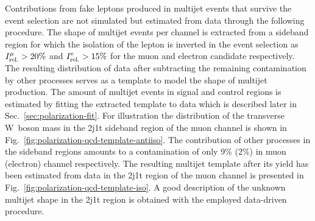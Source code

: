 
Contributions from fake leptons produced in multijet events that survive the event selection are not simulated but estimated from data through the following procedure. The shape of multijet events per channel is extracted from a sideband region for which the isolation of the lepton is inverted in the event selection as $\muiso>20\%$ and $\eiso>15\%$ for the muon and electron candidate respectively. The resulting distribution of data after subtracting the remaining contamination by other processes serves as a template to model the shape of multijet production. The amount of multijet events in signal and control regions is estimated by fitting the extracted template to data which is described later in Sec.~\ref{sec:polarization-fit}. For illustration the distribution of the transverse W~boson mass in the 2j1t sideband region of the muon channel is shown in Fig.~\ref{fig:polarization-qcd-template-antiiso}. The contribution of other processes in the sideband regions amounts to a contamination of only 9\% (2\%) in muon (electron) channel respectively. The resulting multijet template after its yield has been estimated from data in the 2j1t region of the muon channel is presented in Fig.~\ref{fig:polarization-qcd-template-iso}. A good description of the unknown multijet shape in the 2j1t region is obtained with the employed data-driven procedure.

